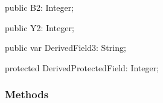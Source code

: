 \documentclass{report}
\newif\ifpdf
\begin{document}
\begin{list}{}
\begin{flushleft}
\ifpdf
\end{flushleft}
\fi


\par  \label{ok_inherited_members.TDerived-B2}
\item[\textbf{B2}\hfill]
\ifpdf
\begin{flushleft}
\fi
\begin{ttfamily}
public B2: Integer;\end{ttfamily}

\ifpdf
\end{flushleft}
\fi


\par  \label{ok_inherited_members.TDerived-Y2}
\item[\textbf{Y2}\hfill]
\ifpdf
\begin{flushleft}
\fi
\begin{ttfamily}
public Y2: Integer;\end{ttfamily}

\ifpdf
\end{flushleft}
\fi


\par  \label{ok_inherited_members.TDerived-DerivedField3}
\item[\textbf{DerivedField3}\hfill]
\ifpdf
\begin{flushleft}
\fi
\begin{ttfamily}
public var DerivedField3: String;\end{ttfamily}

\ifpdf
\end{flushleft}
\fi


\par  \label{ok_inherited_members.TDerived-DerivedProtectedField}
\item[\textbf{DerivedProtectedField}\hfill]
\ifpdf
\begin{flushleft}
\fi
\begin{ttfamily}
protected DerivedProtectedField: Integer;\end{ttfamily}

\ifpdf
\end{flushleft}
\fi


\par  \end{list}
\subsubsection*{\large{\textbf{Methods}}\normalsize\hspace{1ex}\hfill}
\end{document}
